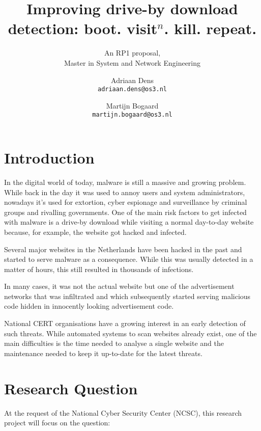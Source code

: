\documentclass{scrartcl}
\title{Improving drive-by download detection: boot. visit$^n$. kill. repeat.}
\subtitle{An RP1 proposal,\\Master in System and Network Engineering}
\author{
  Adriaan Dens\\
   \texttt{adriaan.dens@os3.nl}
  \and
  Martijn Bogaard\\
   \texttt{martijn.bogaard@os3.nl}
}
\begin{document}
\maketitle

\section{Introduction}

In the digital world of today, malware is still a massive and growing problem. While back in the day it was used to annoy users and system administrators, nowadays it's used for extortion, cyber espionage and surveillance by criminal groups and rivalling governments. One of the main risk factors to get infected with malware is a drive-by download while visiting a normal day-to-day website because, for example, the website got hacked and infected. 

Several major websites in the Netherlands have been hacked in the past and started to serve malware as a consequence. While this was usually detected in a matter of hours, this still resulted in thousands of infections.

In many cases, it was not the actual website but one of the advertisement networks that was infiltrated and which subsequently started serving malicious code hidden in innocently looking advertisement code.


National CERT organisations have a growing interest in an early detection of such threats. While automated systems to scan websites already exist, one of the main difficulties is the time needed to analyse a single website and the maintenance needed to keep it up-to-date for the latest threats.

\section{Research Question}
At the request of the National Cyber Security Center (NCSC), this research project will focus on the question:\\ %
\end{document}
